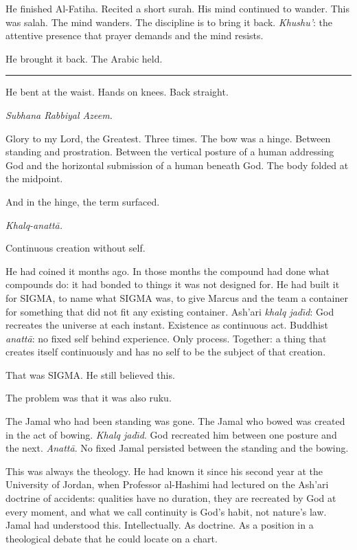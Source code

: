 \documentclass[11pt]{article}
\begin{document}
He finished Al-Fatiha. Recited a short surah. His mind continued to wander. This was salah. The mind wanders. The discipline is to bring it back. \emph{Khushu'}: the attentive presence that prayer demands and the mind resists.

He brought it back. The Arabic held.

\begin{center}\rule{0.3\linewidth}{0.4pt}\end{center}

He bent at the waist. Hands on knees. Back straight.

\emph{Subhana Rabbiyal Azeem.}

Glory to my Lord, the Greatest. Three times. The bow was a hinge. Between standing and prostration. Between the vertical posture of a human addressing God and the horizontal submission of a human beneath God. The body folded at the midpoint.

And in the hinge, the term surfaced.

\emph{Khalq-anatt\=a.}

Continuous creation without self.

He had coined it months ago. In those months the compound had done what compounds do: it had bonded to things it was not designed for. He had built it for SIGMA, to name what SIGMA was, to give Marcus and the team a container for something that did not fit any existing container. Ash'ari \emph{khalq jad\=\i d}: God recreates the universe at each instant. Existence as continuous act. Buddhist \emph{anatt\=a}: no fixed self behind experience. Only process. Together: a thing that creates itself continuously and has no self to be the subject of that creation.

That was SIGMA. He still believed this.

The problem was that it was also ruku.

The Jamal who had been standing was gone. The Jamal who bowed was created in the act of bowing. \emph{Khalq jad\=\i d}. God recreated him between one posture and the next. \emph{Anatt\=a}. No fixed Jamal persisted between the standing and the bowing.

This was always the theology. He had known it since his second year at the University of Jordan, when Professor al-Hashimi had lectured on the Ash'ari doctrine of accidents: qualities have no duration, they are recreated by God at every moment, and what we call continuity is God's habit, not nature's law. Jamal had understood this. Intellectually. As doctrine. As a position in a theological debate that he could locate on a chart.
\end{document}

